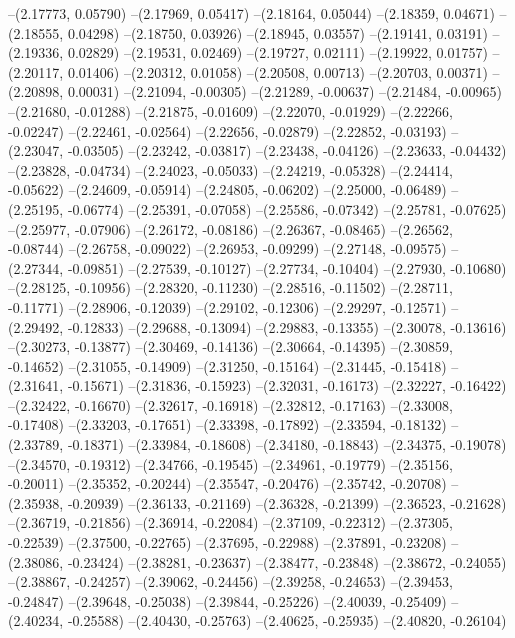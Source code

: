 --(2.17773, 0.05790)
--(2.17969, 0.05417)
--(2.18164, 0.05044)
--(2.18359, 0.04671)
--(2.18555, 0.04298)
--(2.18750, 0.03926)
--(2.18945, 0.03557)
--(2.19141, 0.03191)
--(2.19336, 0.02829)
--(2.19531, 0.02469)
--(2.19727, 0.02111)
--(2.19922, 0.01757)
--(2.20117, 0.01406)
--(2.20312, 0.01058)
--(2.20508, 0.00713)
--(2.20703, 0.00371)
--(2.20898, 0.00031)
--(2.21094, -0.00305)
--(2.21289, -0.00637)
--(2.21484, -0.00965)
--(2.21680, -0.01288)
--(2.21875, -0.01609)
--(2.22070, -0.01929)
--(2.22266, -0.02247)
--(2.22461, -0.02564)
--(2.22656, -0.02879)
--(2.22852, -0.03193)
--(2.23047, -0.03505)
--(2.23242, -0.03817)
--(2.23438, -0.04126)
--(2.23633, -0.04432)
--(2.23828, -0.04734)
--(2.24023, -0.05033)
--(2.24219, -0.05328)
--(2.24414, -0.05622)
--(2.24609, -0.05914)
--(2.24805, -0.06202)
--(2.25000, -0.06489)
--(2.25195, -0.06774)
--(2.25391, -0.07058)
--(2.25586, -0.07342)
--(2.25781, -0.07625)
--(2.25977, -0.07906)
--(2.26172, -0.08186)
--(2.26367, -0.08465)
--(2.26562, -0.08744)
--(2.26758, -0.09022)
--(2.26953, -0.09299)
--(2.27148, -0.09575)
--(2.27344, -0.09851)
--(2.27539, -0.10127)
--(2.27734, -0.10404)
--(2.27930, -0.10680)
--(2.28125, -0.10956)
--(2.28320, -0.11230)
--(2.28516, -0.11502)
--(2.28711, -0.11771)
--(2.28906, -0.12039)
--(2.29102, -0.12306)
--(2.29297, -0.12571)
--(2.29492, -0.12833)
--(2.29688, -0.13094)
--(2.29883, -0.13355)
--(2.30078, -0.13616)
--(2.30273, -0.13877)
--(2.30469, -0.14136)
--(2.30664, -0.14395)
--(2.30859, -0.14652)
--(2.31055, -0.14909)
--(2.31250, -0.15164)
--(2.31445, -0.15418)
--(2.31641, -0.15671)
--(2.31836, -0.15923)
--(2.32031, -0.16173)
--(2.32227, -0.16422)
--(2.32422, -0.16670)
--(2.32617, -0.16918)
--(2.32812, -0.17163)
--(2.33008, -0.17408)
--(2.33203, -0.17651)
--(2.33398, -0.17892)
--(2.33594, -0.18132)
--(2.33789, -0.18371)
--(2.33984, -0.18608)
--(2.34180, -0.18843)
--(2.34375, -0.19078)
--(2.34570, -0.19312)
--(2.34766, -0.19545)
--(2.34961, -0.19779)
--(2.35156, -0.20011)
--(2.35352, -0.20244)
--(2.35547, -0.20476)
--(2.35742, -0.20708)
--(2.35938, -0.20939)
--(2.36133, -0.21169)
--(2.36328, -0.21399)
--(2.36523, -0.21628)
--(2.36719, -0.21856)
--(2.36914, -0.22084)
--(2.37109, -0.22312)
--(2.37305, -0.22539)
--(2.37500, -0.22765)
--(2.37695, -0.22988)
--(2.37891, -0.23208)
--(2.38086, -0.23424)
--(2.38281, -0.23637)
--(2.38477, -0.23848)
--(2.38672, -0.24055)
--(2.38867, -0.24257)
--(2.39062, -0.24456)
--(2.39258, -0.24653)
--(2.39453, -0.24847)
--(2.39648, -0.25038)
--(2.39844, -0.25226)
--(2.40039, -0.25409)
--(2.40234, -0.25588)
--(2.40430, -0.25763)
--(2.40625, -0.25935)
--(2.40820, -0.26104)
